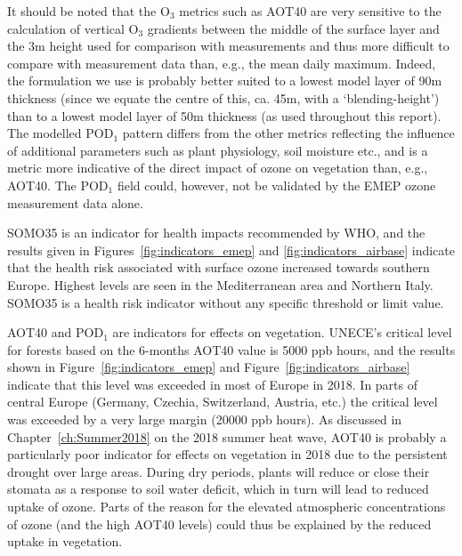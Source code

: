 It should be noted that the O$_3$ metrics such as AOT40 are very sensitive to the calculation of vertical O$_3$ gradients between the middle of the surface layer and the 3m height used for comparison with measurements \citep{Tuovinen:EP2007} and thus more difficult to compare with measurement data than, e.g., the mean daily maximum. Indeed, the formulation we use \citep{Simpson_et_al:EMEP} is probably better suited to a lowest model layer of 90m thickness (since we equate the centre of this, ca. 45m, with a `blending-height') than to a lowest model layer of 50m thickness (as used throughout this report). 
The modelled POD$_1$ pattern differs from the other metrics reflecting the influence of additional parameters such as plant physiology, soil moisture etc., and is a metric more indicative of the direct impact of ozone on vegetation than, e.g., AOT40. The POD$_1$ field could, however, not be validated by the EMEP ozone measurement data alone. 

SOMO35 is an indicator for health impacts recommended by WHO, and the results given in Figures~\ref{fig:indicators_emep} and \ref{fig:indicators_airbase} indicate that the health risk associated with surface ozone increased towards southern Europe. Highest levels are seen in the Mediterranean area and Northern Italy. SOMO35 is a health risk indicator without any specific threshold or limit value.

AOT40 and POD$_1$ are indicators for effects on vegetation. UNECE's critical level for forests based on the 6-months AOT40 value is 5000 ppb hours, and the results shown in Figure~\ref{fig:indicators_emep} and Figure~\ref{fig:indicators_airbase} indicate that this level was exceeded in most of Europe in 2018. In parts of central Europe (Germany, Czechia, Switzerland, Austria, etc.) the critical level was exceeded by a very large margin (20000 ppb hours). As discussed in Chapter~\ref{ch:Summer2018} on the 2018 summer heat wave, AOT40 is probably a particularly poor indicator for effects on vegetation in 2018 due to the persistent drought over large areas. During dry periods, plants will reduce or close their stomata as a response to soil water deficit, which in turn will lead to reduced uptake of ozone. Parts of the reason for the elevated atmospheric concentrations of ozone (and the high AOT40 levels) could thus be explained by the reduced uptake in vegetation. 

